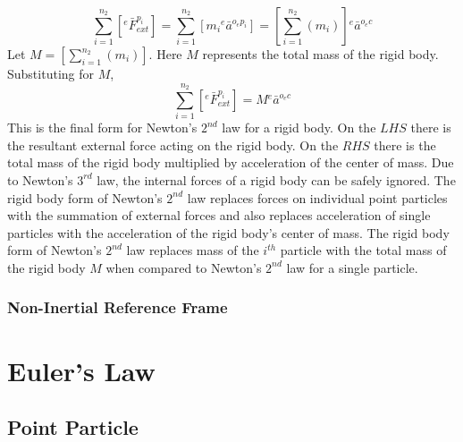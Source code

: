\documentclass[class=report, 12pt, crop=false]{standalone}
\begin{document}
\begin{center}
$$\sum^{n_{2}}_{i = 1}\left[{}^{e}\bar{F}^{p_{i}}_{ext}\right] = \sum^{n_{2}}_{i = 1}\left[m_{i}{}^{e}\bar{a}^{o_{e}p_{i}}\right] = \left[\sum^{n_{2}}_{i = 1}\left(m_{i}\right)\right]{}^{e}\bar{a}^{o_{e}c}$$
Let $\displaystyle M = \left[\sum^{n_{2}}_{i = 1}\left(m_{i}\right)\right]$. Here $M$ represents the total mass of the rigid body. Substituting for $M$,
$$\sum^{n_{2}}_{i = 1}\left[{}^{e}\bar{F}^{p_{i}}_{ext}\right] = M{}^{e}\bar{a}^{o_{e}c}$$
This is the final form for Newton's $2^{nd}$ law for a rigid body. On the $LHS$ there is the resultant external force acting on the rigid body. On the $RHS$ there is the total mass of the rigid body multiplied by acceleration of the center of mass. Due to Newton's $3^{rd}$ law, the internal forces of a rigid body can be safely ignored. The rigid body form of Newton's $2^{nd}$ law replaces forces on individual point particles with the summation of external forces and also replaces acceleration of single particles with the acceleration of the rigid body's center of mass. The rigid body form of Newton's $2^{nd}$ law replaces mass of the $i^{th}$ particle with the total mass of the rigid body $M$ when compared to Newton's $2^{nd}$ law for a single particle.
\subsubsection{Non-Inertial Reference Frame}
\begin{comment}
\end{comment}

\section{Euler's Law}
\begin{comment}
\end{comment}
\subsection{Point Particle}
\begin{comment}
\end{comment}

\end{center}
\end{document}

